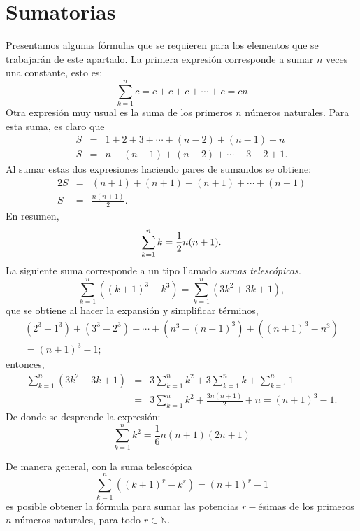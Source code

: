 \section{Sumatorias}

Presentamos algunas fórmulas que se requieren para los elementos que se trabajarán de este apartado. La primera expresión corresponde a sumar $n$ veces una constante, esto es:
\begin{equation} \label{sumas}
  \sum_{k=1}^{n}c= c+c+c+\cdots +c= cn
\end{equation}
Otra expresión muy usual es la suma de los primeros $n$ números naturales. Para esta suma, es claro que
\begin{eqnarray*}
  S &=& 1+2+3+\cdots +\left( n-2\right) +\left( n-1\right) +n \\
  S &=& n+\left( n-1\right) +\left( n-2\right) +\cdots +3+2+1.
\end{eqnarray*}
Al sumar estas dos expresiones haciendo pares de sumandos se obtiene:
\begin{eqnarray*}
  2S &=& ( n+1) +(n+1)+(n+1) +\cdots +(n+1)\\
  S&=&\frac{n(n+1)}{2}.
\end{eqnarray*} En resumen,
\begin{equation} \label{sumas1}
  \displaystyle\sum_{k=1}^{n}k= \frac{1}{2}n(n+1) .
\end{equation}
La siguiente suma corresponde a un tipo llamado \emph{sumas telescópicas}. 
\[\sum_{k=1}^{n}\left( \left( k+1\right) ^{3}-k^{3}\right) =\sum_{k=1}^{n}\left( 3k^{2}+3k+1\right)\!,\]
que se obtiene al hacer la expansión y simplificar términos,
\begin{multline*}
  \left(2^{3}-1^{3}\right) +\left( 3^{3}-2^{3}\right) +\cdots +\left( n^{3}-\left(
  n-1\right) ^{3}\right) +\left( (n+1) ^{3}-n^{3}\right)\\ = (n+1) ^{3}-1;
\end{multline*}
entonces,
\begin{eqnarray*}
  \sum_{k=1}^{n}\left( 3k^{2}+3k+1\right) &=& 3\sum_{k=1}^{n}k^{2}+3\sum_{k=1}^{n}k+\sum_{k=1}^{n}1 \\
  &=& 3\sum_{k=1}^{n}k^{2}+\frac{3n(n+1) }{2}+n = (n+1)^{3}-1.
\end{eqnarray*}
De donde se desprende la expresión:
\begin{equation} \label{sumas2}
  \sum_{k=1}^{n}k^{2}= \frac{1}{6}n(n+1) \left(2n+1\right)
\end{equation}
\begin{tcolorbox}
  De manera general, con la suma telescópica
  \[\sum\limits _{k=1}^{n}\left( \left(k+1\right) ^{r}-k^{r}\right) = (n+1) ^{r}-1\]
  es posible obtener la fórmula para sumar las potencias $r-$ésimas de los primeros $n$ números naturales,
  para todo $r\in \mathbb{N}$.
\end{tcolorbox}
